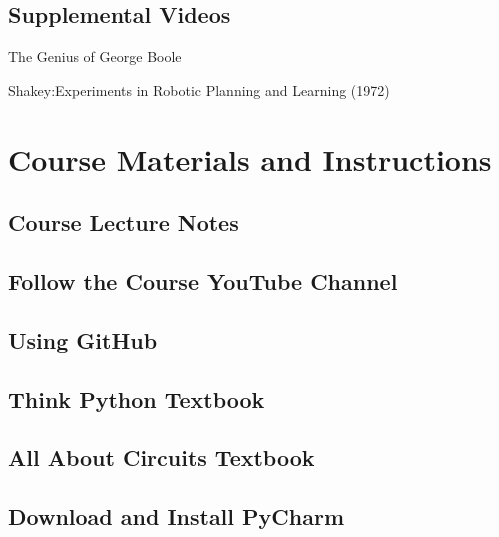 \documentclass[
]{book}
\begin{document}
\hypertarget{supplemental-videos}{%
\section{Supplemental Videos}\label{supplemental-videos}}

The Genius of George Boole

Shakey:Experiments in Robotic Planning and Learning (1972)

\hypertarget{course-materials-and-instructions}{%
\chapter{Course Materials and Instructions}\label{course-materials-and-instructions}}

\hypertarget{course-lecture-notes}{%
\section{Course Lecture Notes}\label{course-lecture-notes}}

\hypertarget{follow-the-course-youtube-channel}{%
\section{Follow the Course YouTube Channel}\label{follow-the-course-youtube-channel}}

\hypertarget{using-github}{%
\section{Using GitHub}\label{using-github}}

\hypertarget{think-python-textbook}{%
\section{Think Python Textbook}\label{think-python-textbook}}

\hypertarget{all-about-circuits-textbook}{%
\section{All About Circuits Textbook}\label{all-about-circuits-textbook}}

\hypertarget{download-and-install-pycharm}{%
\section{Download and Install PyCharm}\label{download-and-install-pycharm}}
\end{document}
